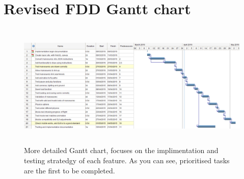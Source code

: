 \section{Revised FDD Gantt chart}
\begin{landscape}
\begin{figure}[h!]
  \centering
  \label{app:gantt2}
  	\caption{More detailed Gantt chart, focuses on the implimentation and testing stratedgy of each feature. As you can see, prioritised tasks are the first to be completed.}
      \includegraphics[width=23cm, height=6cm]{images/second.png}
\end{figure}
\end{landscape}
\clearpage